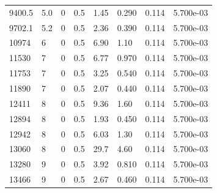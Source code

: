 \documentclass[preview]{standalone}
\begin{document}
{{{\begin{tabular}{L{1.2cm}C{1.2cm} C{0.3cm}C{0.5cm} C{1.4cm}C{1.4cm} C{1.4cm}C{1.4cm}}
  9400.5  &   5.0  & 0     & 0.5 &  1.45  & 0.290  & 0.114 &  5.700e-03   \\ 
  9702.1  &   5.2  & 0     & 0.5 &  2.36  & 0.390  & 0.114 &  5.700e-03   \\ 
  10974  &     6  & 0     & 0.5 &  6.90  & 1.10  & 0.114 &  5.700e-03   \\ 
  11530  &     7  & 0     & 0.5 &  6.77  & 0.970  & 0.114 &  5.700e-03   \\ 
  11753  &     7  & 0     & 0.5 &  3.25  & 0.540  & 0.114 &  5.700e-03   \\ 
  11890  &     7  & 0     & 0.5 &  2.07  & 0.440  & 0.114 &  5.700e-03   \\ 
  12411  &     8  & 0     & 0.5 &  9.36  & 1.60  & 0.114 &  5.700e-03   \\ 
  12894  &     8  & 0     & 0.5 &  1.93  & 0.450  & 0.114 &  5.700e-03   \\ 
  12942  &     8  & 0     & 0.5 &  6.03  & 1.30  & 0.114 &  5.700e-03   \\ 
  13060  &     8  & 0     & 0.5 &  29.7  & 4.60  & 0.114 &  5.700e-03   \\ 
  13280  &     9  & 0     & 0.5 &  3.92  & 0.810  & 0.114 &  5.700e-03   \\ 
  13466  &     9  & 0     & 0.5 &  2.67  & 0.460  & 0.114 &  5.700e-03   \\ 
\hline 
\end{tabular} 

}}}
\end{document}
